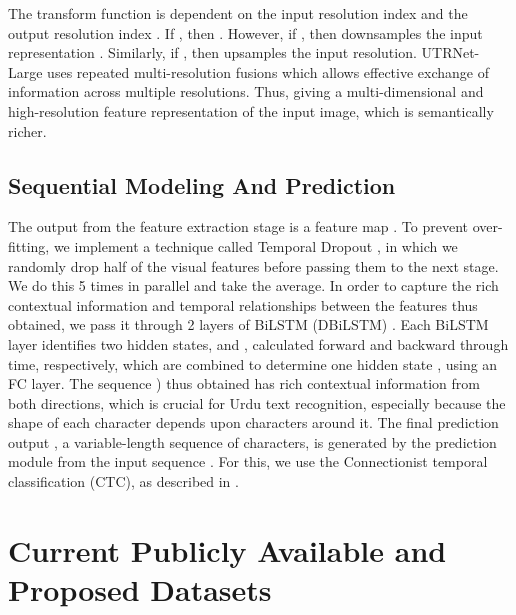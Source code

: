 \documentclass[runningheads]{llncs}
\newcommand{\ModelName}{{UTRNet}\xspace}
\begin{document}
The transform function  is dependent on the input resolution index  and the output resolution index . If , then . However, if , then  downsamples the input representation . Similarly, if , then  upsamples the input resolution. \ModelName-Large uses repeated multi-resolution fusions which allows effective exchange of information across multiple resolutions. Thus, giving a multi-dimensional and high-resolution feature representation of the input image, which is semantically richer.

\subsection{Sequential Modeling And Prediction}

The output from the feature extraction stage is a feature map . To prevent over-fitting, we implement a technique called Temporal Dropout \cite{temporal_orig}, in which we randomly drop half of the visual features before passing them to the next stage. We do this 5 times in parallel and take the average. In order to capture the rich contextual information and temporal relationships between the features thus obtained, we pass it through 2 layers of BiLSTM \cite{bilsm_orig} (DBiLSTM) \cite{crnn_orig}. Each BiLSTM layer identifies two hidden states,  and , calculated forward and backward through time, respectively, which are combined to determine one hidden state , using an FC layer. The sequence ) thus obtained has rich contextual information from both directions, which is crucial for Urdu text recognition, especially because the shape of each character depends upon characters around it. The final prediction output , a variable-length sequence of characters, is generated by the prediction module from the input sequence . For this, we use the Connectionist temporal classification (CTC), as described in \cite{ctc_paper}.
 
\section{Current Publicly Available and Proposed Datasets}
\label{section:dataset_section}
\end{document}
